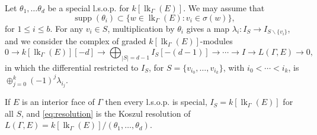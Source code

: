 \documentclass[ALCO, Unicode,published]{cedram}
\DeclareMathOperator{\lk}{lk}
\DeclareMathOperator{\supp}{supp}
\begin{document}
Let $\theta_1, \ldots \theta_d$ be a special l.s.o.p. for $k[\lk_\Gamma(E)]$. We may assume that 
\[
\supp(\theta_i) \subset \{ w \in \lk_\Gamma(E) : v_i \in \sigma(w) \},
\]
for $1 \leq i \leq b$.  For any $v_i \in S$, multiplication by $\theta_i$ gives a map $\lambda_i \colon I_{S} \to I_{S \smallsetminus \{v_i\}}$, and we consider the complex of graded $k[\lk_{\Gamma}(E)]$-modules
 \begin{equation} \label{eq:resolution}
 0  \to k[\lk_{\Gamma}(E)][-d] \to \bigoplus_{ |S|  = d - 1 } I_{S}[-(d-1)] \to \dotsb  \to  I \to L(\Gamma,E) \to 0,
\end{equation}
in which
 the differential restricted to $I_S$, for $S= \{v_{i_0}, \ldots, v_{i_k}\}$, with $i_0 < \cdots < i_k$, is $\oplus_{j = 0}^k (-1)^j \lambda_{i_j}$. 


\begin{example}
If $E$ is an interior face of $\Gamma$ then every l.s.o.p. is special, $I_S = k[\lk_{\Gamma}(E)]$ for all $S$, and \eqref{eq:resolution} is the Koszul resolution of $L(\Gamma,E) = k[\lk_{\Gamma}(E)]/(\theta_1,\ldots,\theta_{d})$.
\end{example}
\end{document}
